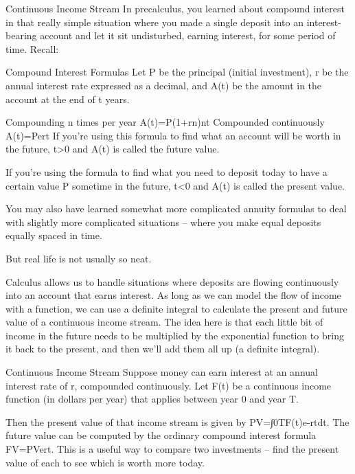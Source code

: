 Continuous Income Stream
In precalculus, you learned about compound interest in that really simple situation where you made a single deposit into an interest-bearing account and let it sit undisturbed, earning interest, for some period of time. Recall:

Compound Interest Formulas
Let P be the principal (initial investment), r be the annual interest rate expressed as a decimal, and A(t) be the amount in the account at the end of t years.

Compounding n times per year
A(t)=P(1+rn)nt
Compounded continuously
A(t)=Pert
If you’re using this formula to find what an account will be worth in the future, t>0 and A(t) is called the future value.

If you're using the formula to find what you need to deposit today to have a certain value P sometime in the future, t<0 and A(t) is called the present value.

You may also have learned somewhat more complicated annuity formulas to deal with slightly more complicated situations – where you make equal deposits equally spaced in time.

But real life is not usually so neat.

Calculus allows us to handle situations where deposits are flowing continuously into an account that earns interest. As long as we can model the flow of income with a function, we can use a definite integral to calculate the present and future value of a continuous income stream. The idea here is that each little bit of income in the future needs to be multiplied by the exponential function to bring it back to the present, and then we'll add them all up (a definite integral).

Continuous Income Stream
Suppose money can earn interest at an annual interest rate of r, compounded continuously. Let F(t) be a continuous income function (in dollars per year) that applies between year 0 and year T.

Then the present value of that income stream is given by
PV=∫0TF(t)e-rtdt.
The future value can be computed by the ordinary compound interest formula
FV=PVert.
This is a useful way to compare two investments – find the present value of each to see which is worth more today.

